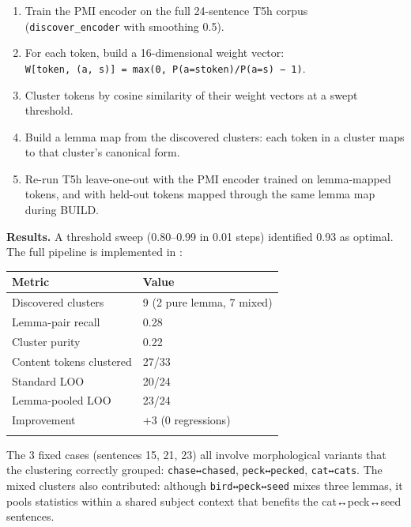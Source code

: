 \documentclass[
  twocolumn,
  10pt,
  a4paper]{article}
\providecommand{\tightlist}{%
  \setlength{\itemsep}{0pt}\setlength{\parskip}{0pt}}
\newenvironment{tsxtable}{\begin{center}\footnotesize}{\end{center}}
\let\endhead\relax
\begin{document}
\begin{enumerate}
\def\labelenumi{\arabic{enumi}.}
\tightlist
\item
  Train the PMI encoder on the full 24-sentence T5h corpus
  (\texttt{discover\_encoder} with smoothing 0.5).
\item
  For each token, build a 16-dimensional weight vector:
  \texttt{W{[}token,\ (a,\ s){]}\ =\ max(0,\ P(a=s\textbar{}token)/P(a=s)\ −\ 1)}.
\item
  Cluster tokens by cosine similarity of their weight vectors at a swept
  threshold.
\item
  Build a lemma map from the discovered clusters: each token in a
  cluster maps to that cluster's canonical form.
\item
  Re-run T5h leave-one-out with the PMI encoder trained on lemma-mapped
  tokens, and with held-out tokens mapped through the same lemma map
  during BUILD.
\end{enumerate}

\textbf{Results.} A threshold sweep (0.80--0.99 in 0.01 steps)
identified 0.93 as optimal. The full pipeline is implemented in
\texttt{}:

\begin{tsxtable}\begin{tabularx}{\linewidth}{@{}YY@{}}
\toprule\noalign{}
Metric & Value \\
\midrule\noalign{}
\endhead
Discovered clusters & 9 (2 pure lemma, 7 mixed) \\
Lemma-pair recall & 0.28 \\
Cluster purity & 0.22 \\
Content tokens clustered & 27/33 \\
Standard LOO & 20/24 \\
Lemma-pooled LOO & 23/24 \\
Improvement & +3 (0 regressions) \\
\bottomrule\noalign{}
\end{tabularx}\end{tsxtable}

The 3 fixed cases (sentences 15, 21, 23) all involve morphological
variants that the clustering correctly grouped: \texttt{chase↔chased},
\texttt{peck↔pecked}, \texttt{cat↔cats}. The mixed clusters also
contributed: although \texttt{bird↔peck↔seed} mixes three lemmas, it
pools statistics within a shared subject context that benefits the
cat↔peck↔seed sentences.
\end{document}
